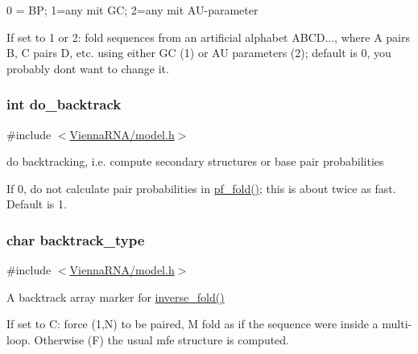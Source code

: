 0 = BP; 1=any mit GC; 2=any mit A\+U-\/parameter 

If set to 1 or 2\+: fold sequences from an artificial alphabet A\+B\+CD..., where A pairs B, C pairs D, etc. using either GC (1) or AU parameters (2); default is 0, you probably don\textquotesingle{}t want to change it. 
\subsubsection[{\texorpdfstring{do\+\_\+backtrack}{do_backtrack}}]{\setlength{\rightskip}{0pt plus 5cm}int do\+\_\+backtrack}\hypertarget{group__model__details_gad512b5dd4dbec60faccfe137bb474489}{}\label{group__model__details_gad512b5dd4dbec60faccfe137bb474489}


{\ttfamily \#include $<$\hyperlink{model_8h}{Vienna\+R\+N\+A/model.\+h}$>$}



do backtracking, i.\+e. compute secondary structures or base pair probabilities 

If 0, do not calculate pair probabilities in \hyperlink{group__pf__fold_gadc3db3d98742427e7001a7fd36ef28c2}{pf\+\_\+fold()}; this is about twice as fast. Default is 1. 
\subsubsection[{\texorpdfstring{backtrack\+\_\+type}{backtrack_type}}]{\setlength{\rightskip}{0pt plus 5cm}char backtrack\+\_\+type}\hypertarget{group__model__details_ga83bdb43472a259c71e69fa9f70f420c3}{}\label{group__model__details_ga83bdb43472a259c71e69fa9f70f420c3}


{\ttfamily \#include $<$\hyperlink{model_8h}{Vienna\+R\+N\+A/model.\+h}$>$}



A backtrack array marker for \hyperlink{group__inverse__fold_ga7af026de55d4babad879f2c92559cbbc}{inverse\+\_\+fold()} 

If set to \textquotesingle{}C\textquotesingle{}\+: force (1,N) to be paired, \textquotesingle{}M\textquotesingle{} fold as if the sequence were inside a multi-\/loop. Otherwise (\textquotesingle{}F\textquotesingle{}) the usual mfe structure is computed. 
